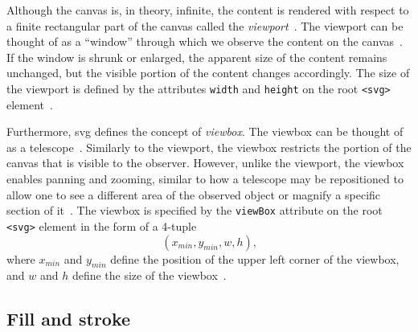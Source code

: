 Although the canvas is, in theory, infinite, the content is rendered with respect to a finite rectangular part of the canvas called the \emph{viewport}~\cite[Sec.~7.1]{svg11}. The viewport can be thought of as a \enquote{window} through which we observe the content on the canvas~\cite{brown_svg_viewbox, tutsplus_viewbox_viewport}. If the window is shrunk or enlarged, the apparent size of the content remains unchanged, but the visible portion of the content changes accordingly. The size of the viewport is defined by the attributes \texttt{width} and \texttt{height} on the root \texttt{<svg>} element~\cite[Sec.~7.2]{svg11}.

Furthermore, \gls{svg} defines the concept of \emph{viewbox}. The viewbox can be thought of as a telescope~\cite{tutsplus_viewbox_viewport, aditya_understanding_viewbox}. Similarly to the viewport, the viewbox restricts the portion of the canvas that is visible to the observer. However, unlike the viewport, the viewbox enables panning and zooming, similar to how a telescope may be repositioned to allow one to see a different area of the observed object or magnify a specific section of it~\cite{tutsplus_viewbox_viewport, aditya_understanding_viewbox}. The viewbox is specified by the \texttt{viewBox} attribute on the root \texttt{<svg>} element in the form of a 4-tuple
\[
    \left(x_{min}, y_{min}, w, h\right)\textbf{,}
\]
where $x_{min}$ and $y_{min}$ define the position of the upper left corner of the viewbox, and $w$ and $h$ define the size of the viewbox~\cite[Sec.~7.7]{svg11}.

\subsection{Fill and stroke}

